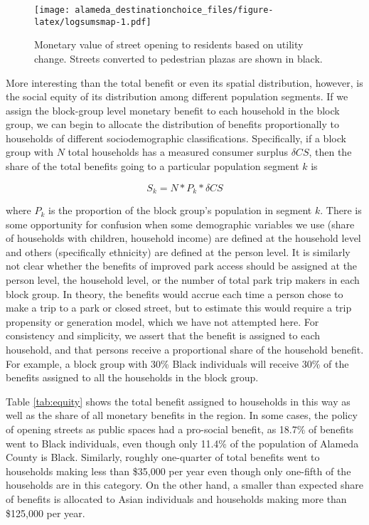 \documentclass[3p, authoryear, review]{elsarticle} %
\begin{document}
\begin{figure}
\centering
\texttt{[image: alameda\_destinationchoice\_files/figure-latex/logsumsmap-1.pdf]}
\caption{\label{fig:logsumsmap}Monetary value of street opening to residents based on utility change. Streets converted to pedestrian plazas are shown in black.}
\end{figure}

More interesting than the total benefit or even its spatial distribution,
however, is the social equity of its distribution among different population
segments. If we assign the block-group level monetary benefit to each household
in the block group, we can begin to allocate the distribution of benefits
proportionally to households of different sociodemographic classifications.
Specifically, if a block group with \(N\) total households has a measured consumer
surplus \(\delta CS\), then the share of the total benefits going to a particular
population segment \(k\) is

\begin{equation}
  S_k = N * P_k * \delta CS
  \label{eq:cs-alloc}
\end{equation}

where \(P_k\) is the proportion of the block group's population in segment \(k\).
There is some opportunity for confusion when some demographic variables we use
(share of households with children, household income) are defined at the
household level and others (specifically ethnicity) are defined at the person level. It is
similarly not clear whether the benefits of improved park access should be
assigned at the person level, the household level, or the number of total park
trip makers in each block group. In theory, the benefits would accrue each time
a person chose to make a trip to a park or closed street, but to estimate this
would require a trip propensity or generation model, which we have not attempted
here. For consistency and simplicity, we assert that the benefit is assigned to
each household, and that persons receive a proportional share of the household
benefit. For example, a block group with 30\% Black individuals will receive 30\%
of the benefits assigned to all the households in the block group.

Table \ref{tab:equity} shows the total benefit assigned to households in this
way as well as the share of all monetary benefits in the region. In some cases,
the policy of opening streets as public spaces had a pro-social benefit, as
18.7\% of benefits went to Black individuals, even though only 11.4\% of the
population of Alameda County is Black. Similarly, roughly one-quarter of total
benefits went to households making less than \$35,000 per year even though only
one-fifth of the households are in this category. On the other hand, a smaller
than expected share of benefits is allocated to Asian individuals and households
making more than \$125,000 per year.
\end{document}

